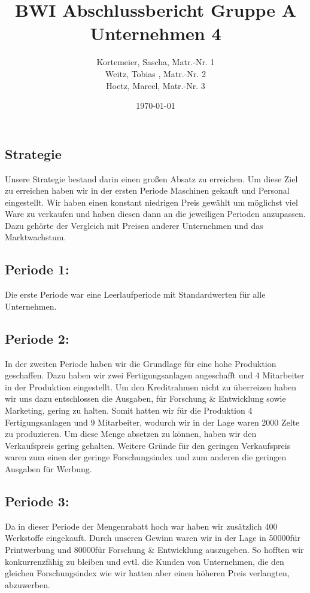 \documentclass[a4paper, 12pt]{report}
\title{BWI Abschlussbericht Gruppe A Unternehmen 4}
\author{Kortemeier, Sascha, Matr.-Nr. 1 \\
Weitz, Tobias , Matr.-Nr. 2 \\
Hoetz, Marcel, Matr.-Nr. 3}
\date{\today}
\begin{document}
\maketitle
\tableofcontents



\begin{flushleft}
\chapter{Strategie}
Unsere Strategie bestand darin einen großen Absatz zu erreichen. 
Um diese Ziel zu erreichen haben wir in der ersten Periode Maschinen gekauft und Personal eingestellt. 
Wir haben einen konstant niedrigen Preis gewählt um möglichst viel Ware zu verkaufen und haben diesen dann an die jeweiligen Perioden anzupassen. 
Dazu gehörte der Vergleich mit Preisen anderer Unternehmen und das Marktwachstum. 

\section{Periode 1:}
Die erste Periode war eine Leerlaufperiode mit Standardwerten für alle Unternehmen.	

\section{Periode 2:}
In der zweiten Periode haben wir die Grundlage für eine hohe Produktion geschaffen.
Dazu haben wir zwei Fertigungsanlagen angeschafft und 4 Mitarbeiter in der Produktion eingestellt.
Um den Kreditrahmen nicht zu überreizen haben wir uns dazu entschlossen die Ausgaben, für Forschung \& Entwicklung sowie Marketing, gering zu halten.
Somit hatten wir für die Produktion 4 Fertigungsanlagen und 9 Mitarbeiter, wodurch wir in der Lage waren 2000 Zelte zu produzieren.
Um diese Menge absetzen zu können, haben wir den Verkaufspreis gering gehalten.
Weitere Gründe für den geringen Verkaufspreis waren zum einen der geringe Forschungsindex und zum anderen die geringen Ausgaben für Werbung.

\section{Periode 3:}
Da in dieser Periode der Mengenrabatt hoch war haben wir zusätzlich 400 Werkstoffe eingekauft. 
Durch unseren Gewinn waren wir in der Lage in 50000\texteuro für Printwerbung und 80000\texteuro für Forschung \& Entwicklung auszugeben.
So hofften wir konkurrenzfähig zu bleiben und evtl. die Kunden von Unternehmen, die den gleichen Forschungsindex wie wir hatten aber einen höheren Preis verlangten, abzuwerben.


\end{flushleft}
\end{document}
